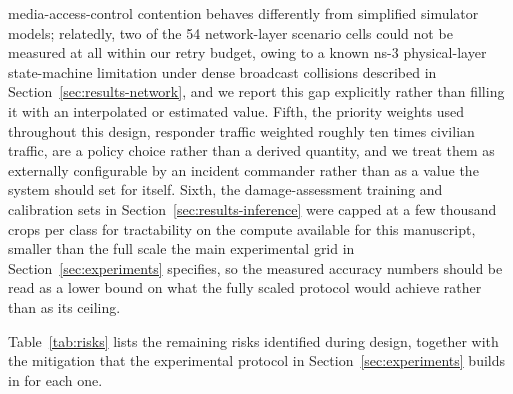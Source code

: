 \documentclass[drones,article,submit,moreauthors]{Definitions/mdpi}
\begin{document}
media-access-control contention behaves differently from simplified simulator models; relatedly, two of the 54 network-layer scenario cells could not be measured at all within our retry budget, owing to a known ns-3 physical-layer state-machine limitation under dense broadcast collisions described in Section~\ref{sec:results-network}, and we report this gap explicitly rather than filling it with an interpolated or estimated value. Fifth, the priority weights used throughout this design, responder traffic weighted roughly ten times civilian traffic, are a policy choice rather than a derived quantity, and we treat them as externally configurable by an incident commander rather than as a value the system should set for itself. Sixth, the damage-assessment training and calibration sets in Section~\ref{sec:results-inference} were capped at a few thousand crops per class for tractability on the compute available for this manuscript, smaller than the full scale the main experimental grid in Section~\ref{sec:experiments} specifies, so the measured accuracy numbers should be read as a lower bound on what the fully scaled protocol would achieve rather than as its ceiling.

Table~\ref{tab:risks} lists the remaining risks identified during design, together with the mitigation that the experimental protocol in Section~\ref{sec:experiments} builds in for each one.
\end{document}
